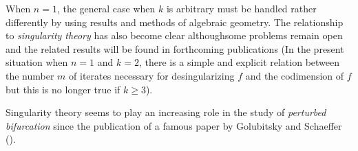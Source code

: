 When $n = 1$, the general case when $k$ is arbitrary must be handled rather differently by using results and methods of algebraic geometry. The relationship to {\em singularity theory} has also become clear although\pageoriginale some problems remain open and the related results will be found in forthcoming publications (In the present situation when $n = 1$ and $k = 2$, there is a simple and explicit relation between the number $m$ of iterates necessary for desingularizing $f$ and the codimension of $f$ but this is no longer true if $k \geq 3$).

Singularity theory seems to play an increasing role in the study of {\em perturbed bifurcation} since the publication of a famous paper by Golubitsky and Schaeffer (\cite{5}).

